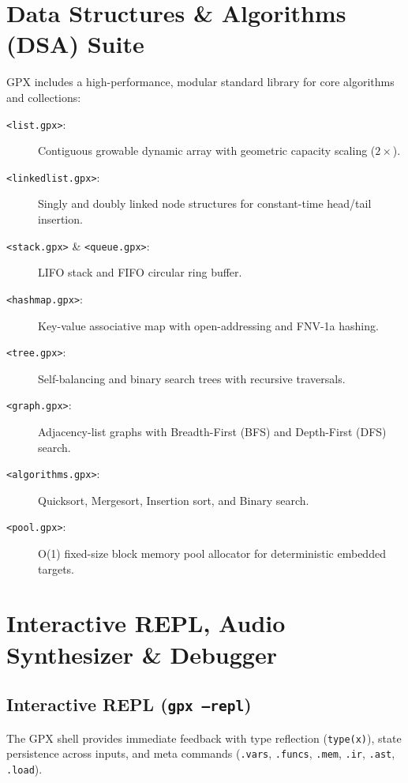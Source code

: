 \documentclass[11pt,a4paper]{report}
\begin{document}
\chapter{Data Structures \& Algorithms (DSA) Suite}

GPX includes a high-performance, modular standard library for core algorithms and collections:

\begin{description}
    \item[\texttt{<list.gpx>}:] Contiguous growable dynamic array with geometric capacity scaling ($2\times$).
    \item[\texttt{<linkedlist.gpx>}:] Singly and doubly linked node structures for constant-time head/tail insertion.
    \item[\texttt{<stack.gpx>} \& \texttt{<queue.gpx>}:] LIFO stack and FIFO circular ring buffer.
    \item[\texttt{<hashmap.gpx>}:] Key-value associative map with open-addressing and FNV-1a hashing.
    \item[\texttt{<tree.gpx>}:] Self-balancing and binary search trees with recursive traversals.
    \item[\texttt{<graph.gpx>}:] Adjacency-list graphs with Breadth-First (BFS) and Depth-First (DFS) search.
    \item[\texttt{<algorithms.gpx>}:] Quicksort, Mergesort, Insertion sort, and Binary search.
    \item[\texttt{<pool.gpx>}:] O(1) fixed-size block memory pool allocator for deterministic embedded targets.
\end{description}

\chapter{Interactive REPL, Audio Synthesizer \& Debugger}

\section{Interactive REPL (\texttt{gpx --repl})}
The GPX shell provides immediate feedback with type reflection (\texttt{type(x)}), state persistence across inputs, and meta commands (\texttt{.vars}, \texttt{.funcs}, \texttt{.mem}, \texttt{.ir}, \texttt{.ast}, \texttt{.load}).
\end{document}
